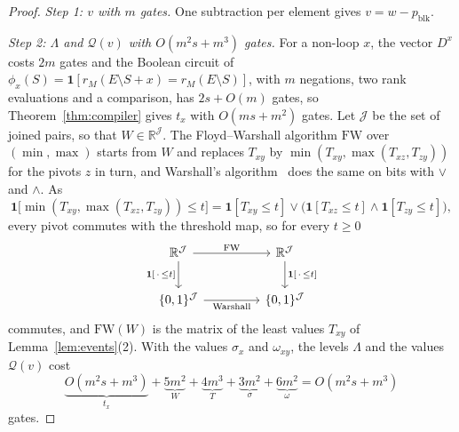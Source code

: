 \documentclass[11pt]{article}
\newcommand{\R}{\mathbb R}
\newcommand{\blk}{\operatorname{blk}}
\begin{document}
\begin{proof}
\emph{Step 1: $v$ with $m$ gates.}  One subtraction per element gives $v=w-p_{\blk}$.

\emph{Step 2: $\Lambda$ and $\mathcal Q(v)$ with $O(m^{2}s+m^{3})$ gates.}  For a non-loop $x$, the vector $D^{x}$ costs $2m$
gates and the Boolean circuit of $\phi_x(S)=\mathbf 1[r_M(E\setminus S+x)=r_M(E\setminus S)]$,
with $m$ negations, two rank evaluations and a comparison, has $2s+O(m)$ gates, so
Theorem~\ref{thm:compiler} gives $t_x$ with $O(ms+m^{2})$ gates.  Let $\mathcal J$ be the
set of joined pairs, so that $W\in\R^{\mathcal J}$.  The Floyd--Warshall algorithm
$\mathrm{FW}$ over $(\min,\max)$ starts from $W$ and replaces $T_{xy}$ by
$\min(T_{xy},\max(T_{xz},T_{zy}))$ for the pivots $z$ in turn, and Warshall's
algorithm~\cite{warshall62} does the same on bits with $\vee$ and $\wedge$.  As
\[
  \mathbf 1\bigl[\min(T_{xy},\max(T_{xz},T_{zy}))\le t\bigr]
  =\mathbf 1[T_{xy}\le t]\vee\bigl(\mathbf 1[T_{xz}\le t]\wedge\mathbf 1[T_{zy}\le t]\bigr),
\]
every pivot commutes with the threshold map, so for every $t\ge0$
\[
  \begin{tikzcd}[column sep=4.5em,row sep=2.2em]
    \R^{\mathcal J}\arrow[r,"\mathrm{FW}"]\arrow[d,"{\mathbf 1[\,\cdot\,\le t]}"'] &
    \R^{\mathcal J}\arrow[d,"{\mathbf 1[\,\cdot\,\le t]}"]\\
    \{0,1\}^{\mathcal J}\arrow[r,"\text{Warshall}"'] & \{0,1\}^{\mathcal J}
  \end{tikzcd}
\]
commutes, and $\mathrm{FW}(W)$ is the matrix of the least values $T_{xy}$ of
Lemma~\ref{lem:events}(2).  With the
values $\sigma_x$ and $\omega_{xy}$, the levels $\Lambda$ and the values
$\mathcal Q(v)$ cost
\[
  \underbrace{O(m^{2}s+m^{3})}_{t_x}+\underbrace{5m^{2}}_{W}+\underbrace{4m^{3}}_{T}
  +\underbrace{3m^{2}}_{\sigma}+\underbrace{6m^{2}}_{\omega}=O(m^{2}s+m^{3})
\]
gates.


\end{proof}
\end{document}
